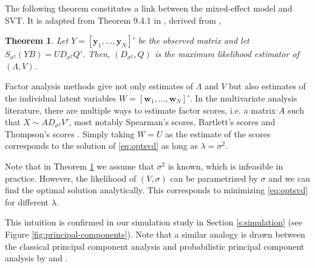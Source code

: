 \documentclass[preprint]{imsart}
\numberwithin{equation}{section}
\theoremstyle{plain}
\newtheorem{theorem}{Theorem}
\newcommand{\tr}[1]{{\textcolor{red}{#1}}}
\newcommand{\by}{\mathbf{y}}
\newcommand{\bw}{\mathbf{w}}
\begin{document}
The following theorem constitutes a link between the mixed-effect model and SVT. It is adapted from Theorem 9.4.1 in \citet{mardia1980multivariate}, derived from \citet{joreskog1967some}, 

\begin{theorem}\label{thm:maxlike}
  Let $Y = [\by_1,...,\by_N]'$ be the observed matrix and let $S_{\sigma^2}(YB) = UD_{\sigma^2}Q'$. Then, $(D_{\sigma^2},Q)$ is the maximum likelihood estimator of $(\Lambda,V)$.
\end{theorem}

Factor analysis methods give not only estimates of $\Lambda$ and $V$ but also estimates of the individual latent variables $W = [\bw_1,...,\bw_N]'$.
In the multivariate analysis literature, there are multiple ways to estimate factor scores, i.e. a matrix $A$ such that $X \sim AD_{\sigma^2}V'$, most notably Spearman's scores, Bartlett's scores and Thompson's scores \citep{kim1978factor}. %
Simply taking $W = U$ as the estimate of the scores corresponds to the solution of \eqref{eq:optsvd} as long as $\lambda = \sigma^2$.

Note that in Theorem \ref{thm:maxlike} we assume that $\sigma^2$ is known, which is infeasible in practice. However, the likelihood of $(V,\sigma)$ can be parametrized by $\sigma$ and we can find the optimal solution analytically. This corresponds to minimizing \eqref{eq:optsvd} for different $\lambda$.


This intuition is confirmed in our simulation study in Section \ref{s:simulation} (see Figure \ref{fig:principal-components}). Note that a similar analogy is drawn between the classical principal component analysis and probabilistic principal component analysis by \citet{tipping1999probabilistic} and \citet{james2000principal}. 

\end{document}
